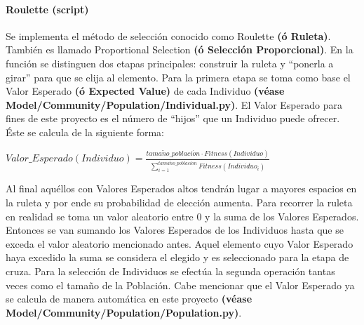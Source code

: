 \documentclass[class=report, crop=false]{standalone}
\begin{document}
\paragraph{Roulette (script)}
\label{sec:a_2_4_1_1}

\begin{fulllineitems}

\begin{DUlineblock}{0em}
\item[] Se implementa el método de selección conocido como 
Roulette \textbf{(ó Ruleta)}.\break
También es llamado Proportional Selection \textbf{(ó Selección Proporcional)}.\break
En la función se distinguen dos etapas principales: construir 
la ruleta y ``ponerla a girar'' para que se elija al elemento.\medskip\break
Para la primera etapa se toma como base el Valor Esperado 
\textbf{(ó Expected Value)} de cada Individuo 
\textbf{(véase Model/Community/Population/Individual.py)}.\medskip\break
El Valor Esperado para fines de este proyecto es el número de 
``hijos'' que un Individuo puede ofrecer. Éste se calcula de la 
siguiente forma:

\begin{center}\(Valor\_Esperado(Individuo) = \frac{tama\tilde{n}o\_poblaci\acute{o}n \cdot Fitness(Individuo)}{\sum_{i=1}^{tama\tilde{n}o\_poblaci\acute{o}n}Fitness(Individuo_i)}\)
\end{center}

Al final aquéllos con Valores Esperados altos tendrán lugar 
a mayores espacios en la ruleta y por ende su probabilidad 
de elección aumenta.\medskip\break
Para recorrer la ruleta en realidad se toma un valor aleatorio 
entre 0 y la suma de los Valores Esperados. Entonces se van 
sumando los Valores Esperados de los Individuos hasta que se 
exceda el valor aleatorio mencionado antes. Aquel elemento cuyo 
Valor Esperado haya excedido la suma se considera el elegido y 
es seleccionado para la etapa de cruza.\medskip\break
Para la selección de Individuos se efectúa la segunda operación 
tantas veces como el tamaño de la Población.\break
Cabe mencionar que el Valor Esperado ya se calcula de manera 
automática en este proyecto \textbf{(véase Model/Community/Population/Population.py)}.
\end{DUlineblock}

\end{fulllineitems}

\end{document}
